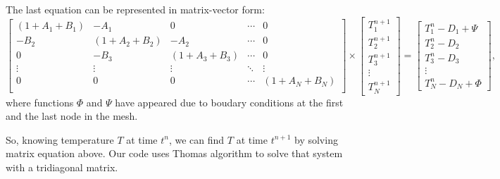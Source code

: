 \documentclass[preprint,pre,floats,aps,amsmath,amssymb]{revtex4}
\begin{document}
The last equation can be represented in matrix-vector form:
\begin{equation*}
\begin{bmatrix} (1+A_{1} + B_{1}) &  -A_{1} & 0 &   \cdots & 0  \\
-B_{2} & (1+A_{2} + B_{2}) &  -A_{2} &   \cdots & 0  \\
0 & -B_{3} & (1+A_{3} + B_{3}) &     \cdots & 0  \\
 \vdots &  \vdots &  \vdots &     \ddots & \vdots  \\
0 & 0 & 0 & \cdots & (1+A_{N} + B_{N})   \\
\end{bmatrix} \times \left[ \begin{array}{c}
 T^{n+1}_{1}  \\ T^{n+1}_{2} \\ T^{n+1}_{3} \\ \vdots  \\ T^{n+1}_{N} \end{array} \right] 
= \left[ \begin{array}{c}
 T^{n}_{1}  - D_{1}  + \Psi \\T^{n}_{2} - D_{2} \\ T^{n}_{3} - D_{3} \\ \vdots  \\T^{n}_{N} - D_{N} + \Phi \end{array} \right],
\end{equation*}
where functions $\Phi$ and $\Psi$ have appeared due to boudary conditions at the first and the last node in the mesh.
\par So, knowing temperature $T$ at time $t^{n}$, we can find $T$ at time $t^{n+1}$ by solving matrix equation above. Our code uses Thomas algorithm to solve that system with a tridiagonal matrix.
\end{document}
